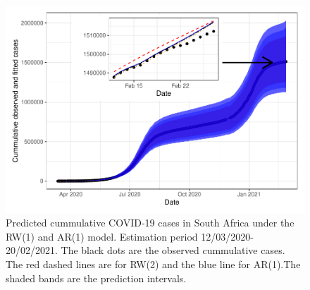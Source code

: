 \documentclass[10pt,letterpaper]{article}
\begin{document}
\begin{figure}[H]
\includegraphics[width=0.95\linewidth]{COVIDincidenceSA_files/figure-latex/predd-1} \caption{Predicted cummulative COVID-19 cases in South Africa under the RW(1) and AR(1) model. Estimation period 12/03/2020-20/02/2021. The black dots are the observed cummulative cases. The red dashed lines are for RW(2) and the blue line for AR(1).The shaded bands are the prediction intervals. }\label{fig:predd}
\end{figure}
\end{document}
